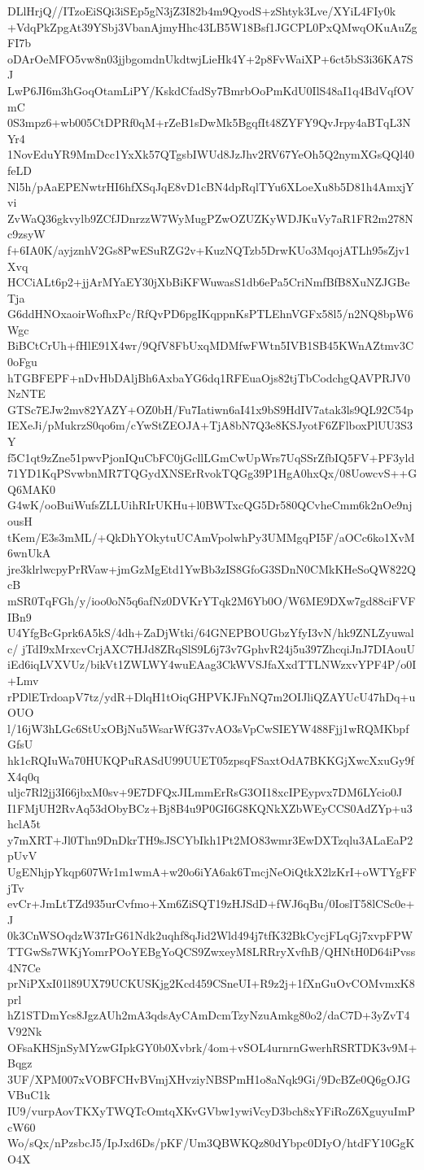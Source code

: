DLlHrjQ//ITzoEiSQi3iSEp5gN3jZ3I82b4m9QyodS+zShtyk3Lve/XYiL4FIy0k
+VdqPkZpgAt39YSbj3VbanAjmyHhc43LB5W18Bsf1JGCPL0PxQMwqOKuAuZgFI7b
oDArOeMFO5vw8n03jjbgomdnUkdtwjLieHk4Y+2p8FvWaiXP+6ct5bS3i36KA7SJ
LwP6JI6m3hGoqOtamLiPY/KskdCfadSy7BmrbOoPmKdU0IlS48aI1q4BdVqfOVmC
0S3mpz6+wb005CtDPRf0qM+rZeB1sDwMk5BgqfIt48ZYFY9QvJrpy4aBTqL3NYr4
1NovEduYR9MmDcc1YxXk57QTgsbIWUd8JzJhv2RV67YeOh5Q2nymXGsQQl40feLD
Nl5h/pAaEPENwtrHI6hfXSqJqE8vD1cBN4dpRqlTYu6XLoeXu8b5D81h4AmxjYvi
ZvWaQ36gkvylb9ZCfJDnrzzW7WyMugPZwOZUZKyWDJKuVy7aR1FR2m278Nc9zsyW
f+6IA0K/ayjznhV2Gs8PwESuRZG2v+KuzNQTzb5DrwKUo3MqojATLh95sZjv1Xvq
HCCiALt6p2+jjArMYaEY30jXbBiKFWuwasS1db6ePa5CriNmfBfB8XuNZJGBeTja
G6ddHNOxaoirWofhxPc/RfQvPD6pgIKqppnKsPTLEhnVGFx58l5/n2NQ8bpW6Wgc
BiBCtCrUh+fHlE91X4wr/9QfV8FbUxqMDMfwFWtn5IVB1SB45KWnAZtmv3C0oFgu
hTGBFEPF+nDvHbDAljBh6AxbaYG6dq1RFEuaOjs82tjTbCodchgQAVPRJV0NzNTE
GTSc7EJw2mv82YAZY+OZ0bH/Fu7Iatiwn6aI41x9bS9HdIV7atak3ls9QL92C54p
IEXeJi/pMukrzS0qo6m/cYwStZEOJA+TjA8bN7Q3e8KSJyotF6ZFlboxPlUU3S3Y
f5C1qt9zZne51pwvPjonIQuCbFC0jGcllLGmCwUpWrs7UqSSrZfbIQ5FV+PF3yld
71YD1KqPSvwbnMR7TQGydXNSErRvokTQGg39P1HgA0hxQx/08UowcvS++GQ6MAK0
G4wK/ooBuiWufsZLLUihRIrUKHu+l0BWTxcQG5Dr580QCvheCmm6k2nOe9njousH
tKem/E3s3mML/+QkDhYOkytuUCAmVpolwhPy3UMMgqPI5F/aOCc6ko1XvM6wnUkA
jre3klrlwcpyPrRVaw+jmGzMgEtd1YwBb3zIS8GfoG3SDnN0CMkKHeSoQW822QcB
mSR0TqFGh/y/ioo0oN5q6afNz0DVKrYTqk2M6Yb0O/W6ME9DXw7gd88ciFVFIBn9
U4YfgBcGprk6A5kS/4dh+ZaDjWtki/64GNEPBOUGbzYfyI3vN/hk9ZNLZyuwalc/
jTdI9xMrxcvCrjAXC7HJd8ZRqSlS9L6j73v7GphvR24j5u397ZhcqiJnJ7DIAouU
iEd6iqLVXVUz/bikVt1ZWLWY4wuEAag3CkWVSJfaXxdTTLNWzxvYPF4P/o0I+Lmv
rPDlETrdoapV7tz/ydR+DlqH1tOiqGHPVKJFnNQ7m2OIJliQZAYUcU47hDq+uOUO
l/16jW3hLGc6StUxOBjNu5WsarWfG37vAO3sVpCwSIEYW488Fjj1wRQMKbpfGfsU
hk1cRQIuWa70HUKQPuRASdU99UUET05zpsqFSaxtOdA7BKKGjXwcXxuGy9fX4q0q
uljc7Rl2jj3I66jbxM0sv+9E7DFQxJILmmErRsG3OI18xcIPEypvx7DM6LYcio0J
I1FMjUH2RvAq53dObyBCz+Bj8B4u9P0GI6G8KQNkXZbWEyCCS0AdZYp+u3hclA5t
y7mXRT+Jl0Thn9DnDkrTH9sJSCYbIkh1Pt2MO83wmr3EwDXTzqlu3ALaEaP2pUvV
UgENhjpYkqp607Wr1m1wmA+w20o6iYA6ak6TmcjNeOiQtkX2lzKrI+oWTYgFFjTv
evCr+JmLtTZd935urCvfmo+Xm6ZiSQT19zHJSdD+fWJ6qBu/0IoslT58lCSc0e+J
0k3CnWSOqdzW37IrG61Ndk2uqhf8qJid2Wld494j7tfK32BkCycjFLqGj7xvpFPW
TTGwSs7WKjYomrPOoYEBgYoQCS9ZwxeyM8LRRryXvfhB/QHNtH0D64iPvss4N7Ce
prNiPXxI01l89UX79UCKUSKjg2Kcd459CSneUI+R9z2j+1fXnGuOvCOMvmxK8prl
hZ1STDmYcs8JgzAUh2mA3qdsAyCAmDcmTzyNzuAmkg80o2/daC7D+3yZvT4V92Nk
OFsaKHSjnSyMYzwGIpkGY0b0Xvbrk/4om+vSOL4urnrnGwerhRSRTDK3v9M+Bqgz
3UF/XPM007xVOBFCHvBVmjXHvziyNBSPmH1o8aNqk9Gi/9DcBZe0Q6gOJGVBuC1k
IU9/vurpAovTKXyTWQTcOmtqXKvGVbw1ywiVcyD3bch8xYFiRoZ6XguyuImPcW60
Wo/sQx/nPzsbcJ5/IpJxd6Ds/pKF/Um3QBWKQz80dYbpc0DIyO/htdFY10GgKO4X
